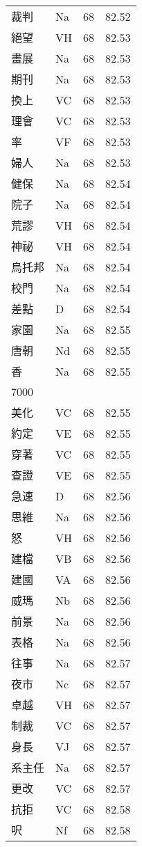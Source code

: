\documentclass[twocolumn]{book}
\begin{document}
\begin{supertabular}{llrr}
裁判 & Na & 68 &  82.52\\
絕望 & VH & 68 &  82.53\\
畫展 & Na & 68 &  82.53\\
期刊 & Na & 68 &  82.53\\
換上 & VC & 68 &  82.53\\
理會 & VC & 68 &  82.53\\
率 & VF & 68 &  82.53\\
婦人 & Na & 68 &  82.53\\
健保 & Na & 68 &  82.54\\
院子 & Na & 68 &  82.54\\
荒謬 & VH & 68 &  82.54\\
神祕 & VH & 68 &  82.54\\
烏托邦 & Na & 68 &  82.54\\
校門 & Na & 68 &  82.54\\
差點 & D & 68 &  82.54\\
家園 & Na & 68 &  82.55\\
唐朝 & Nd & 68 &  82.55\\
香 & Na & 68 &  82.55\\
7000\\
美化 & VC & 68 &  82.55\\
約定 & VE & 68 &  82.55\\
穿著 & VC & 68 &  82.55\\
查證 & VE & 68 &  82.55\\
急速 & D & 68 &  82.56\\
思維 & Na & 68 &  82.56\\
怒 & VH & 68 &  82.56\\
建檔 & VB & 68 &  82.56\\
建國 & VA & 68 &  82.56\\
威瑪 & Nb & 68 &  82.56\\
前景 & Na & 68 &  82.56\\
表格 & Na & 68 &  82.56\\
往事 & Na & 68 &  82.57\\
夜市 & Nc & 68 &  82.57\\
卓越 & VH & 68 &  82.57\\
制裁 & VC & 68 &  82.57\\
身長 & VJ & 68 &  82.57\\
系主任 & Na & 68 &  82.57\\
更改 & VC & 68 &  82.57\\
抗拒 & VC & 68 &  82.58\\
呎 & Nf & 68 &  82.58\\

\end{supertabular}
\end{document}
